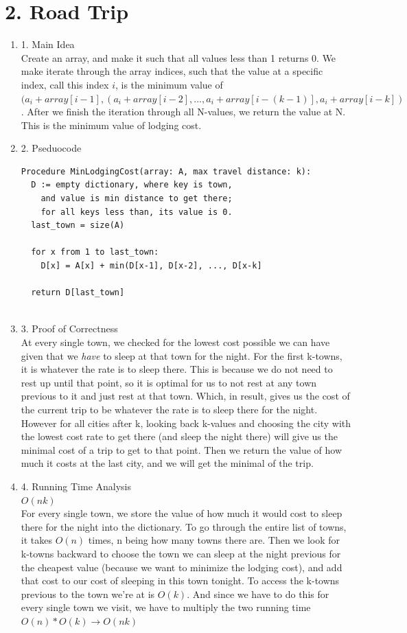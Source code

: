 \documentclass[11pt]{article}
\newenvironment{qparts}{\begin{enumerate}[{(}a{)}]}{\end{enumerate}}
\begin{document}
\section*{2. Road Trip}
\begin{qparts}
\item[1.] Main Idea \\
Create an array, and make it such that all values less than 1 returns 0. We make iterate through the array indices, such that the value at a specific index, call this index $i$, is the minimum value of $(a_i + array[i - 1],(a_i + array[i - 2], ..., a_i + array[i - (k - 1)], a_i + array[i - k])$. After we finish the iteration through all N-values, we return the value at N. This is the minimum value of lodging cost. 
\item[2.] Pseduocode
\begin{verbatim}
Procedure MinLodgingCost(array: A, max travel distance: k):
  D := empty dictionary, where key is town, 
    and value is min distance to get there;
    for all keys less than, its value is 0. 
  last_town = size(A)
  
  for x from 1 to last_town:
    D[x] = A[x] + min(D[x-1], D[x-2], ..., D[x-k]
  
  return D[last_town]
    
\end{verbatim}
\item[3.] Proof of Correctness \\
At every single town, we checked for the lowest cost possible we can have given that we \textit{have} to sleep at that town for the night. For the first k-towns, it is whatever the rate is to sleep there. This is because we do not need to rest up until that point, so it is optimal for us to not rest at any town previous to it and just rest at that town. Which, in result, gives us the cost of the current trip to be whatever the rate is to sleep there for the night. However for all cities after k, looking back k-values and choosing the city with the lowest cost rate to get there (and sleep the night there) will give us the minimal cost of a trip to get to that point. Then we return the value of how much it costs at the last city, and we will get the minimal of the trip. 

\item[4.] Running Time Analysis \\
$O(nk)$ \\

For every single town, we store the value of how much it would cost to sleep there for the night into the dictionary. To go through the entire list of towns, it takes $O(n)$ times, n being how many towns there are. Then we look for k-towns backward to choose the town we can sleep at the night previous for the cheapest value (because we want to minimize the lodging cost), and add that cost to our cost of sleeping in this town tonight. To access the k-towns previous to the town we're at is $O(k)$. And since we have to do this for every single town we visit, we have to multiply the two running time $O(n) * O(k) \rightarrow O(nk)$
\end{qparts}
\end{document}
